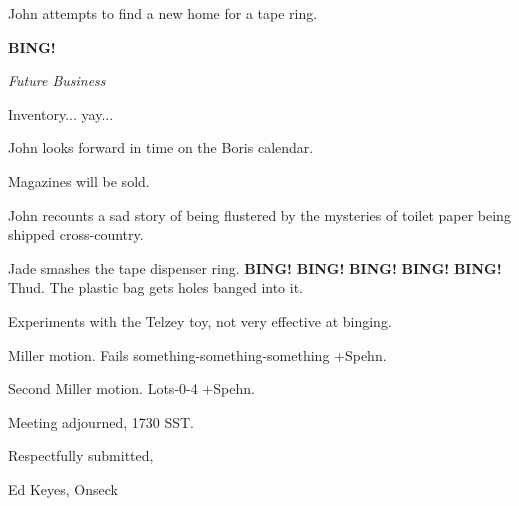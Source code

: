 \documentclass[12pt]{article}
\newcommand{\bing}{{\bf BING!} }
\newcommand{\goto}[1]{\bing \vskip 12pt \centerline{{\em{#1}}}}
\begin{document}
John attempts to find a new home for a tape ring.

\goto{Future Business}

Inventory... yay...

John looks forward in time on the Boris calendar.

Magazines will be sold.

John recounts a sad story of being flustered by the mysteries of toilet paper being shipped cross-country.

Jade smashes the tape dispenser ring. \bing \bing 
\bing \bing \bing Thud. The plastic bag gets holes banged into it.

Experiments with the Telzey toy, not very effective at binging.

Miller motion. Fails something-something-something +Spehn.

Second Miller motion. Lots-0-4 +Spehn.

\vspace{12pt}

\noindent
Meeting adjourned, 1730 SST.

\vspace{18pt}

\centerline{Respectfully submitted,}
\centerline{Ed Keyes, Onseck}
\end{document}
